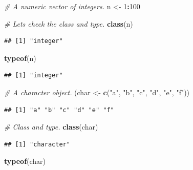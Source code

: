 \documentclass[
]{book}
\newenvironment{Shaded}{\begin{snugshade}}{\end{snugshade}}
\newcommand{\CommentTok}[1]{\textcolor[rgb]{0.56,0.35,0.01}{\textit{#1}}}
\newcommand{\DecValTok}[1]{\textcolor[rgb]{0.00,0.00,0.81}{#1}}
\newcommand{\FunctionTok}[1]{\textcolor[rgb]{0.13,0.29,0.53}{\textbf{#1}}}
\newcommand{\NormalTok}[1]{#1}
\newcommand{\OtherTok}[1]{\textcolor[rgb]{0.56,0.35,0.01}{#1}}
\newcommand{\SpecialCharTok}[1]{\textcolor[rgb]{0.81,0.36,0.00}{\textbf{#1}}}
\newcommand{\StringTok}[1]{\textcolor[rgb]{0.31,0.60,0.02}{#1}}
\begin{document}
\begin{Shaded}
\begin{Highlighting}[]
\CommentTok{\# A numeric vector of integers.}
\NormalTok{n }\OtherTok{\textless{}{-}} \DecValTok{1}\SpecialCharTok{:}\DecValTok{100}

\CommentTok{\# Let\textquotesingle{}s check the class and type.}
\FunctionTok{class}\NormalTok{(n)}
\end{Highlighting}
\end{Shaded}

\begin{verbatim}
## [1] "integer"
\end{verbatim}

\begin{Shaded}
\begin{Highlighting}[]
\FunctionTok{typeof}\NormalTok{(n)}
\end{Highlighting}
\end{Shaded}

\begin{verbatim}
## [1] "integer"
\end{verbatim}

\begin{Shaded}
\begin{Highlighting}[]
\CommentTok{\# A character object.}
\NormalTok{(char }\OtherTok{\textless{}{-}} \FunctionTok{c}\NormalTok{(}\StringTok{"a"}\NormalTok{, }\StringTok{"b"}\NormalTok{, }\StringTok{"c"}\NormalTok{, }\StringTok{"d"}\NormalTok{, }\StringTok{"e"}\NormalTok{, }\StringTok{"f"}\NormalTok{))}
\end{Highlighting}
\end{Shaded}

\begin{verbatim}
## [1] "a" "b" "c" "d" "e" "f"
\end{verbatim}

\begin{Shaded}
\begin{Highlighting}[]
\CommentTok{\# Class and type.}
\FunctionTok{class}\NormalTok{(char)}
\end{Highlighting}
\end{Shaded}

\begin{verbatim}
## [1] "character"
\end{verbatim}

\begin{Shaded}
\begin{Highlighting}[]
\FunctionTok{typeof}\NormalTok{(char)}
\end{Highlighting}
\end{Shaded}
\end{document}
